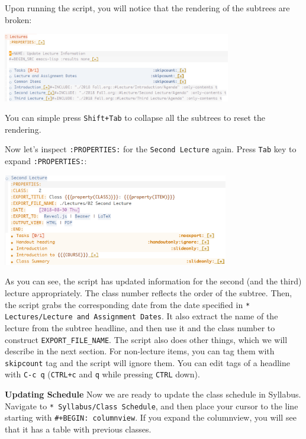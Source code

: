 \documentclass[10pt,article]{article}
\begin{document}
Upon running the script, you will notice that the rendering of the subtrees are broken:

\begin{center}
\includegraphics[height=3cm]{../../../Assets/Images/Org-Teaching/Quickstart_Lectures-Run-Script-Update-Lectures-After.png}
\end{center}

You can simple press \texttt{Shift+Tab} to collapse all the subtrees to reset the rendering.

Now let's inspect \texttt{:PROPERTIES:} for the \texttt{Second Lecture} again. Press \texttt{Tab}
key to expand \texttt{:PROPERTIES:}:

\begin{center}
\includegraphics[height=4cm]{../../../Assets/Images/Org-Teaching/Quickstart_Lectures-Updated-Lecture-Info.png}
\end{center} 

As you can see, the script has updated information for the second (and the
third) lecture appropriately. The class number reflects the order of the
subtree. Then, the script grabs the corresponding date from the date specified
in \texttt{* Lectures/Lecture and Assignment Dates}. It also extract the name of the
lecture from the subtree headline, and then use it and the class number to
construct \texttt{EXPORT\_FILE\_NAME}. The script also does other things, which we will
describe in the next section. For non-lecture items, you can tag them with
\texttt{skipcount} tag and the script will ignore them. You can edit tags of a headline 
with \texttt{C-c q} (\texttt{CTRL+c} and \texttt{q} while pressing \texttt{CTRL} down).

\textbf{Updating Schedule} Now we are ready to update the class schedule in
Syllabus. Navigate to \texttt{* Syllabus/Class Schedule}, and then place your cursor
to the line starting with \texttt{\#+BEGIN: columnview}. If you expand the columnview, 
you will see that it has a table with previous classes. 
\end{document}
